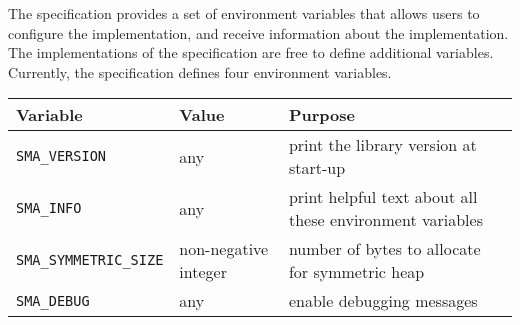 The \openshmem specification provides a set of environment variables that allows
users to configure the \openshmem implementation, and receive information about
the implementation. The implementations of the specification are free to define
additional variables. Currently, the specification defines four environment
variables.

\medskip{}

\begin{tabular}{|l|l|l|}
\hline 
Variable & Value & Purpose\tabularnewline
\hline 
\hline 
\texttt{SMA\_VERSION} & any & print the library version at
start-up\tabularnewline
\hline 
\texttt{SMA\_INFO} & any & print helpful text about all these environment
variables\tabularnewline
\hline 
\texttt{SMA\_SYMMETRIC\_SIZE} & non-negative integer & number of bytes to
allocate for symmetric heap\tabularnewline
\hline 
\texttt{SMA\_DEBUG} & any & enable debugging messages\tabularnewline
\hline 
\end{tabular}

\medskip{}
